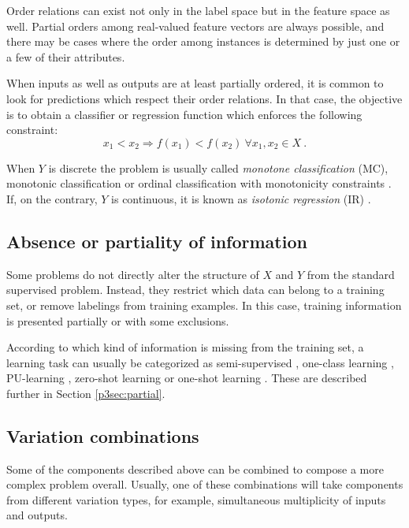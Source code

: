 Order relations can exist not only in the label space but in the feature space as well. Partial orders among real-valued feature vectors are always possible, and there may be cases where the order among instances is determined by just one or a few of their attributes.

When inputs as well as outputs are at least partially ordered, it is common to look for predictions which respect their order relations. In that case, the objective is to obtain a classifier or regression function which enforces the following constraint:
\begin{equation}
x_1<x_2\Rightarrow f(x_1)<f(x_2)~\forall x_1,x_2\in X~.
\end{equation}

When $Y$ is discrete the problem is usually called \emph{monotone classification} (MC), monotonic classification or ordinal classification with monotonicity constraints . If, on the contrary, $Y$ is continuous, it is known as \emph{isotonic regression} (IR) .

\subsection{Absence or partiality of information}

Some problems do not directly alter the structure of $X$ and $Y$ from the standard supervised problem. Instead, they restrict which data can belong to a training set, or remove labelings from training examples. In this case, training information is presented partially or with some exclusions.

According to which kind of information is missing from the training set, a learning task  can usually be categorized as semi-supervised , one-class learning , PU-learning , zero-shot learning  or one-shot learning . These are described further in Section \ref{p3sec:partial}.

\subsection{Variation combinations}

Some of the components described above can be combined to compose a more complex problem overall. Usually, one of these combinations will take components from different variation types, for example, simultaneous multiplicity of inputs and outputs. 

